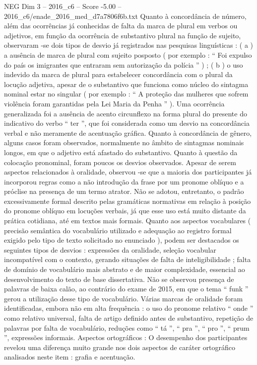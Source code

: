 \begin{textsample}{NEG Dim 3 – 2016\_c6 – Score -5.00 – 2016\_c6/enade\_2016\_med\_d7a7806f6b.txt}
Quanto à concordância de número, além das ocorrências já conhecidas de falta da marca de plural em verbos ou adjetivos, em função da ocorrência de substantivo plural na função de sujeito, observaram -se dois tipos de desvio já registrados nas pesquisas linguísticas : ( a ) a ausência de marca de plural com sujeito posposto ( por exemplo : “ Foi expulso do país os imigrantes que entraram sem autorização da polícia ” ) ; ( b ) o uso indevido da marca de plural para estabelecer concordância com o plural da locução adjetiva, apesar de o substantivo que funciona como núcleo do sintagma nominal estar no singular ( por exemplo : “ A proteção das mulheres que sofrem violência foram garantidas pela Lei Maria da Penha ” ).
Uma ocorrência generalizada foi a ausência de acento circunflexo na forma plural do presente do indicativo do verbo “ ter ”, que foi considerada como um desvio na concordância verbal e não meramente de acentuação gráfica.
Quanto à concordância de gênero, alguns casos foram observados, normalmente no âmbito de sintagmas nominais longos, em que o adjetivo está afastado do substantivo.
Quanto à questão da colocação pronominal, foram poucos os desvios observados.
Apesar de serem aspectos relacionados à oralidade, observou -se que a maioria dos participantes já incorporou regras como a não introdução da frase por um pronome oblíquo e a próclise na presença de um termo atrator.
Não se adotou, entretanto, o padrão excessivamente formal descrito pelas gramáticas normativas em relação à posição do pronome oblíquo em locuções verbais, já que esse uso está muito distante da prática cotidiana, até em textos mais formais.
Quanto aos aspectos vocabulares ( precisão semântica do vocabulário utilizado e adequação ao registro formal exigido pelo tipo de texto solicitado no enunciado ), podem ser destacados os seguintes tipos de desvios : expressões da oralidade, seleção vocabular incompatível com o contexto, gerando situações de falta de inteligibilidade ; falta de domínio de vocabulário mais abstrato e de maior complexidade, essencial ao desenvolvimento do texto de base dissertativa.
Não se observou presença de palavras de baixa calão, ao contrário do exame de 2015, em que o tema “ funk ” gerou a utilização desse tipo de vocabulário.
Várias marcas de oralidade foram identificadas, embora não em alta frequência : o uso do pronome relativo “ onde ” como relativo universal, falta de artigo definido antes de substantivo, repetição de palavras por falta de vocabulário, reduções como “ tá ”, “ pra ”, “ pro ”, “ prum ”, expressões informais.
Aspectos ortográficos : O desempenho dos participantes revelou uma diferença muito grande nos dois aspectos de caráter ortográfico analisados neste item : grafia e acentuação.

\end{textsample}
